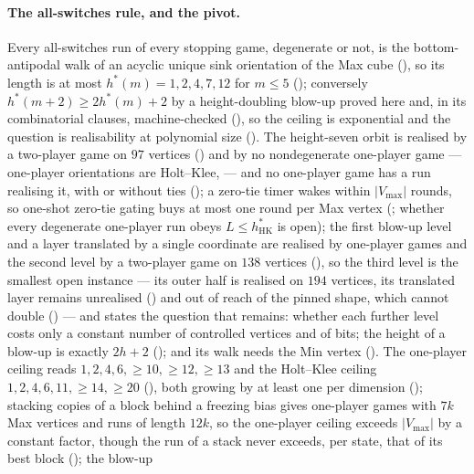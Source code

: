 \documentclass[11pt]{article}
\theoremstyle{plain}
\theoremstyle{definition}
\newcommand{\Vmax}{V_{\max}}
\begin{document}
\paragraph{The all-switches rule, and the pivot.} Every all-switches run
of every stopping game, degenerate or not, is the bottom-antipodal walk
of an acyclic unique sink orientation of the Max cube
(), so its
length is at most $h^{\ast}(m)=1,2,4,7,12$ for $m\le5$
(); conversely
$h^{\ast}(m+2)\ge2h^{\ast}(m)+2$ by a height-doubling blow-up proved here
and, in its combinatorial clauses, machine-checked (), so the ceiling is exponential
and the question is realisability at polynomial size
(). The height-seven orbit is realised by a
two-player game on $97$ vertices () and by no
nondegenerate one-player game --- one-player orientations are
Holt--Klee,  --- and no
one-player game has a run realising it, with or without ties
(); a zero-tie timer wakes within $|\Vmax|$ rounds,
so one-shot zero-tie gating buys at most one round per Max vertex
(; whether every degenerate one-player run
obeys $L\le h^{\ast}_{\mathrm{HK}}$ is open); the first blow-up level and a layer
translated by a single coordinate are realised by one-player games and the
second level by a two-player game on $138$ vertices
(), so the third level is the
smallest open instance --- its outer half is realised on $194$ vertices,
its translated layer remains unrealised () and out
of reach of the pinned shape, which cannot double
() --- and
 states the question
that remains: whether each further level costs only a constant number of
controlled vertices and of bits; the height of a blow-up is exactly
$2h+2$ (); and its walk needs the Min vertex
(). The one-player ceiling reads $1,2,4,6,\ge10,\ge12,\ge13$
and the Holt--Klee ceiling $1,2,4,6,11,\ge14,\ge20$
(), both growing by at least one per dimension
(); stacking copies of a
block behind a freezing bias gives one-player games with $7k$ Max
vertices and runs of length $12k$, so the one-player ceiling exceeds
$|\Vmax|$ by a constant factor, though the run of a stack never exceeds,
per state, that of its best block (); the blow-up
\end{document}
